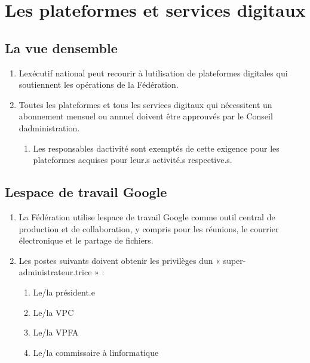 \section{Les plateformes et services digitaux}
\label{les-plateformes-et-services-digitaux}

\subsection{La vue d\textquotesingle ensemble}
\label{la-vue-densemble-6}

\begin{enumerate}
 \item
  L\textquotesingle exécutif national peut recourir à l\textquotesingle utilisation de plateformes digitales qui soutiennent les opérations de la Fédération.
 \item
  Toutes les plateformes et tous les services digitaux qui nécessitent un abonnement mensuel ou annuel doivent être approuvés par le Conseil d\textquotesingle administration.

  \begin{enumerate}
   \item
    Les responsables d\textquotesingle activité sont exemptés de cette exigence pour les plateformes acquises pour leur.s activité.s respective.s.
  \end{enumerate}
\end{enumerate}

\subsection{L\textquotesingle espace de travail Google}
\label{lespace-de-travail-google}

\begin{enumerate}
 \item
  La Fédération utilise l\textquotesingle espace de travail Google comme outil central de production et de collaboration, y compris pour les réunions, le courrier électronique et le partage de fichiers.
 \item
  Les postes suivants doivent obtenir les privilèges d\textquotesingle un « super-administrateur.trice » :

  \begin{enumerate}
   \item
    Le/la président.e
   \item
    Le/la VPC
   \item
    Le/la VPFA
   \item
    Le/la commissaire à l\textquotesingle informatique
  \end{enumerate}
\end{enumerate}

